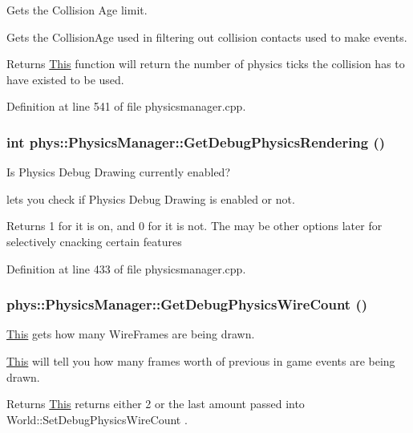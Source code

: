 Gets the Collision Age limit. 

Gets the CollisionAge used in filtering out collision contacts used to make events. \begin{DoxyReturn}{Returns}
\hyperlink{structThis}{This} function will return the number of physics ticks the collision has to have existed to be used. 
\end{DoxyReturn}


Definition at line 541 of file physicsmanager.cpp.

\hypertarget{classphys_1_1PhysicsManager_a64f96d2e4b25c2b9a66042998bf334ff}{
\subsubsection[{GetDebugPhysicsRendering}]{\setlength{\rightskip}{0pt plus 5cm}int phys::PhysicsManager::GetDebugPhysicsRendering ()}}
\label{d3/dcc/classphys_1_1PhysicsManager_a64f96d2e4b25c2b9a66042998bf334ff}


Is Physics Debug Drawing currently enabled? 

lets you check if Physics Debug Drawing is enabled or not. \begin{DoxyReturn}{Returns}
1 for it is on, and 0 for it is not. The may be other options later for selectively cnacking certain features 
\end{DoxyReturn}


Definition at line 433 of file physicsmanager.cpp.

\hypertarget{classphys_1_1PhysicsManager_a8f46e55e4cadfcd1c2c03bcdbfe6c06f}{
\subsubsection[{GetDebugPhysicsWireCount}]{ phys::PhysicsManager::GetDebugPhysicsWireCount ()}}
\label{d3/dcc/classphys_1_1PhysicsManager_a8f46e55e4cadfcd1c2c03bcdbfe6c06f}


\hyperlink{structThis}{This} gets how many WireFrames are being drawn. 

\hyperlink{structThis}{This} will tell you how many frames worth of previous in game events are being drawn. \begin{DoxyReturn}{Returns}
\hyperlink{structThis}{This} returns either 2 or the last amount passed into World::SetDebugPhysicsWireCount . 
\end{DoxyReturn}


